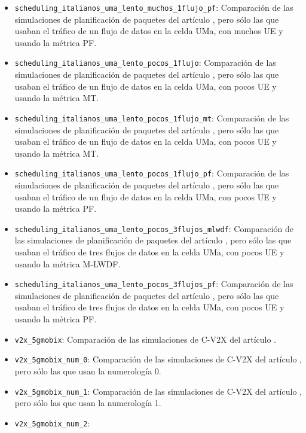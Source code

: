 \documentclass[12pt]{report} %
\begin{document}
\begin{itemize}
Comparación de las simulaciones de planificación de paquetes del artículo \cite{RefWorks:26},
pero sólo las que usaban el tráfico de un flujo de datos en la celda UMa, con muchos UE y usando la métrica MT.
\item \verb|scheduling_italianos_uma_lento_muchos_1flujo_pf|:
Comparación de las simulaciones de planificación de paquetes del artículo \cite{RefWorks:26},
pero sólo las que usaban el tráfico de un flujo de datos en la celda UMa, con muchos UE y usando la métrica PF.
\item \verb|scheduling_italianos_uma_lento_pocos_1flujo|:
Comparación de las simulaciones de planificación de paquetes del artículo \cite{RefWorks:26},
pero sólo las que usaban el tráfico de un flujo de datos en la celda UMa, con pocos UE y usando la métrica MT.
\item \verb|scheduling_italianos_uma_lento_pocos_1flujo_mt|:
Comparación de las simulaciones de planificación de paquetes del artículo \cite{RefWorks:26},
pero sólo las que usaban el tráfico de un flujo de datos en la celda UMa, con pocos UE y usando la métrica MT.
\item \verb|scheduling_italianos_uma_lento_pocos_1flujo_pf|:
Comparación de las simulaciones de planificación de paquetes del artículo \cite{RefWorks:26},
pero sólo las que usaban el tráfico de un flujo de datos en la celda UMa, con pocos UE y usando la métrica PF.
\item \verb|scheduling_italianos_uma_lento_pocos_3flujos_mlwdf|:
Comparación de las simulaciones de planificación de paquetes del artículo \cite{RefWorks:26},
pero sólo las que usaban el tráfico de tres flujos de datos en la celda UMa, con pocos UE y usando la métrica M-LWDF.
\item \verb|scheduling_italianos_uma_lento_pocos_3flujos_pf|:
Comparación de las simulaciones de planificación de paquetes del artículo \cite{RefWorks:26},
pero sólo las que usaban el tráfico de tres flujos de datos en la celda UMa, con pocos UE y usando la métrica PF.
\item \verb|v2x_5gmobix|:
Comparación de las simulaciones de C-V2X del artículo \cite{RefWorks:25}.
\item \verb|v2x_5gmobix_num_0|:
Comparación de las simulaciones de C-V2X del artículo \cite{RefWorks:25},
pero sólo las que usan la numerología 0.
\item \verb|v2x_5gmobix_num_1|:
Comparación de las simulaciones de C-V2X del artículo \cite{RefWorks:25},
pero sólo las que usan la numerología 1.
\item \verb|v2x_5gmobix_num_2|:

\end{itemize}
\end{document}
